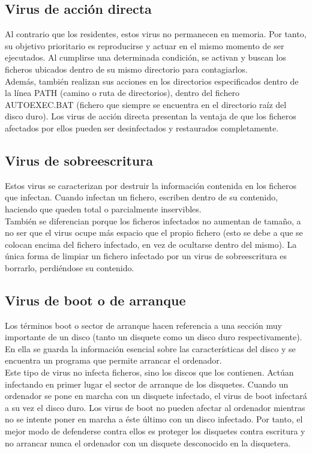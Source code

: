 \documentclass[12pt,a4paper]{article}
\begin{document}
	\subsection{Virus de acción directa}
	Al contrario que los residentes, estos virus no permanecen en memoria. Por tanto, su objetivo prioritario es reproducirse y actuar en el mismo momento de ser ejecutados. Al cumplirse una determinada condición, se activan y buscan los ficheros ubicados dentro de su mismo directorio para contagiarlos.\\
	
	Además, también realizan sus acciones en los directorios especificados dentro de la línea PATH (camino o ruta de directorios), dentro del fichero AUTOEXEC.BAT (fichero que siempre se encuentra en el directorio raíz del disco duro).
	Los virus de acción directa presentan la ventaja de que los ficheros afectados por ellos pueden ser desinfectados y restaurados completamente.
	
	\subsection{Virus de sobreescritura}
	Estos virus se caracterizan por destruir la información contenida en los ficheros que infectan. Cuando infectan un fichero, escriben dentro de su contenido, haciendo que queden total o parcialmente inservibles.\\
	
	También se diferencian porque los ficheros infectados no aumentan de tamaño, a no ser que el virus ocupe más espacio que el propio fichero (esto se debe a que se colocan encima del fichero infectado, en vez de ocultarse dentro del mismo).
	La única forma de limpiar un fichero infectado por un virus de sobreescritura es borrarlo, perdiéndose su contenido.
	
	\subsection{Virus de boot o de arranque}
	Los términos boot o sector de arranque hacen referencia a una sección muy importante de un disco (tanto un disquete como un disco duro respectivamente). En ella se guarda la información esencial sobre las características del disco y se encuentra un programa que permite arrancar el ordenador.\\
	
	Este tipo de virus no infecta ficheros, sino los discos que los contienen. Actúan infectando en primer lugar el sector de arranque de los disquetes. Cuando un ordenador se pone en marcha con un disquete infectado, el virus de boot infectará a su vez el disco duro.
	Los virus de boot no pueden afectar al ordenador mientras no se intente poner en marcha a éste último con un disco infectado. Por tanto, el mejor modo de defenderse contra ellos es proteger los disquetes contra escritura y no arrancar nunca el ordenador con un disquete desconocido en la disquetera.
	
\end{document}
